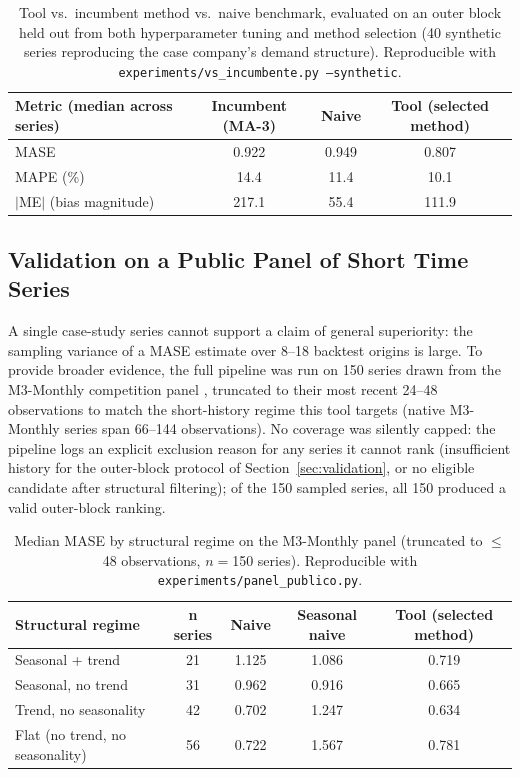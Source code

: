 \documentclass[forecasting,article,submit,pdftex,moreauthors]{Definitions/mdpi}
\begin{document}
\begin{table}[H]
\caption{Tool vs.\ incumbent method vs.\ naive benchmark, evaluated on an outer block held out from both hyperparameter tuning and method selection (40 synthetic series reproducing the case company's demand structure). Reproducible with \texttt{experiments/vs\_incumbente.py --synthetic}.\label{tab:incumbente}}
\centering
\begin{tabularx}{\textwidth}{Xccc}
\toprule
\textbf{Metric (median across series)} & \textbf{Incumbent (MA-3)} & \textbf{Naive} & \textbf{Tool (selected method)} \\
\midrule
MASE   & 0.922 & 0.949 & 0.807 \\
MAPE (\%) & 14.4 & 11.4 & 10.1 \\
$|$ME$|$ (bias magnitude) & 217.1 & 55.4 & 111.9 \\
\bottomrule
\end{tabularx}
\end{table}

\subsection{Validation on a Public Panel of Short Time Series}
\label{sec:panel}

A single case-study series cannot support a claim of general superiority: the sampling variance of a MASE estimate over 8--18 backtest origins is large. To provide broader evidence, the full pipeline was run on 150 series drawn from the M3-Monthly competition panel \cite{makridakis2020m3}, truncated to their most recent 24--48 observations to match the short-history regime this tool targets (native M3-Monthly series span 66--144 observations). No coverage was silently capped: the pipeline logs an explicit exclusion reason for any series it cannot rank (insufficient history for the outer-block protocol of Section~\ref{sec:validation}, or no eligible candidate after structural filtering); of the 150 sampled series, all 150 produced a valid outer-block ranking.

\begin{table}[H]
\caption{Median MASE by structural regime on the M3-Monthly panel (truncated to $\leq$48 observations, $n=$150 series). Reproducible with \texttt{experiments/panel\_publico.py}.\label{tab:panel}}
\centering
\begin{tabularx}{\textwidth}{Xcccc}
\toprule
\textbf{Structural regime} & \textbf{n series} & \textbf{Naive} & \textbf{Seasonal naive} & \textbf{Tool (selected method)} \\
\midrule
Seasonal + trend & 21 & 1.125 & 1.086 & 0.719 \\
Seasonal, no trend & 31 & 0.962 & 0.916 & 0.665 \\
Trend, no seasonality & 42 & 0.702 & 1.247 & 0.634 \\
Flat (no trend, no seasonality) & 56 & 0.722 & 1.567 & 0.781 \\
\bottomrule
\end{tabularx}
\end{table}
\end{document}
